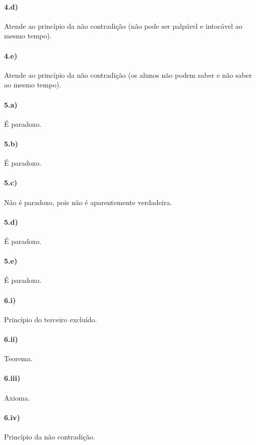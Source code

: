 \documentclass[pdftex,a4paper,12pt,brazil]{article} %
\begin{document}
\paragraph{4.d)} Atende ao princípio da não contradição (não pode ser palpável
e intocável ao mesmo tempo).

\paragraph{4.e)} Atende ao princípio da não contradição (os alunos não podem
saber e não saber ao mesmo tempo).

\paragraph{5.a)} É paradoxo.

\paragraph{5.b)} É paradoxo.

\paragraph{5.c)} Não é paradoxo, pois não é aparentemente verdadeira.

\paragraph{5.d)} É paradoxo.

\paragraph{5.e)} É paradoxo.

\paragraph{6.i)} Princípio do terceiro excluído.

\paragraph{6.ii)} Teorema.

\paragraph{6.iii)} Axioma.

\paragraph{6.iv)} Princípio da não contradição.
\end{document}
